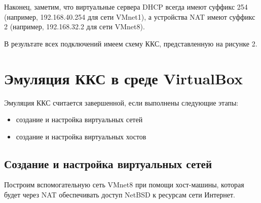 \documentclass[a4paper, 12pt]{article}		%
\begin{document}
Наконец, заметим, что виртуальные сервера DHCP всегда имеют суффикс 254 (например, 192.168.40.254 для сети VMnet1), а устройства NAT имеют суффикс 2 (например, 192.168.32.2 для сети VMnet8). 

В результате всех подключений имеем схему ККС, представленную на рисунке 2.

\newpage
\section{Эмуляция ККС в среде VirtualBox}

Эмуляция ККС считается завершенной, если выполнены следующие этапы:
\begin{itemize}
\item создание и настройка виртуальных сетей
\item создание и настройка виртуальных хостов
\end{itemize}

\subsection{Создание и настройка виртуальных сетей}

Построим вспомогательную сеть VMnet8 при помощи хост-машины, которая будет через NAT обеспечивать доступ NetBSD к ресурсам сети Интернет.
\end{document}
